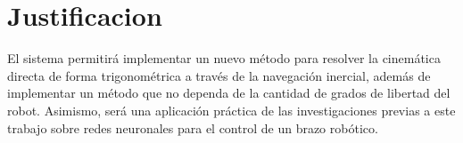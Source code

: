\section{Justificacion}

El sistema permitirá implementar un nuevo método para resolver la cinemática directa de forma trigonométrica a través de la navegación inercial, además de implementar un método que no dependa de la cantidad de grados de libertad del robot. Asimismo, será una aplicación práctica de las investigaciones previas a este trabajo sobre redes neuronales para el control de un brazo robótico.